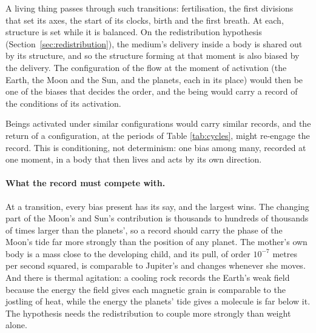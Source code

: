 \documentclass[11pt,a4paper]{article}
\begin{document}
\begin{hypbar}
A living thing passes through such transitions: fertilisation, the first divisions that set its axes, the start of its clocks, birth and the first breath. At each, structure is set while it is balanced. On the redistribution hypothesis (Section~\ref{sec:redistribution}), the medium's delivery inside a body is shared out by its structure, and so the structure forming at that moment is also biased by the delivery. The configuration of the flow at the moment of activation (the Earth, the Moon and the Sun, and the planets, each in its place) would then be one of the biases that decides the order, and the being would carry a record of the conditions of its activation.

Beings activated under similar configurations would carry similar records, and the return of a configuration, at the periods of Table \ref{tab:cycles}, might re-engage the record. This is conditioning, not determinism: one bias among many, recorded at one moment, in a body that then lives and acts by its own direction.
\end{hypbar}

\paragraph{What the record must compete with.} At a transition, every bias present has its say, and the largest wins. The changing part of the Moon's and Sun's contribution is thousands to hundreds of thousands of times larger than the planets', so a record should carry the phase of the Moon's tide far more strongly than the position of any planet. The mother's own body is a mass close to the developing child, and its pull, of order $10^{-7}$ metres per second squared, is comparable to Jupiter's and changes whenever she moves. And there is thermal agitation: a cooling rock records the Earth's weak field because the energy the field gives each magnetic grain is comparable to the jostling of heat, while the energy the planets' tide gives a molecule is far below it. The hypothesis needs the redistribution to couple more strongly than weight alone. 
\end{document}

